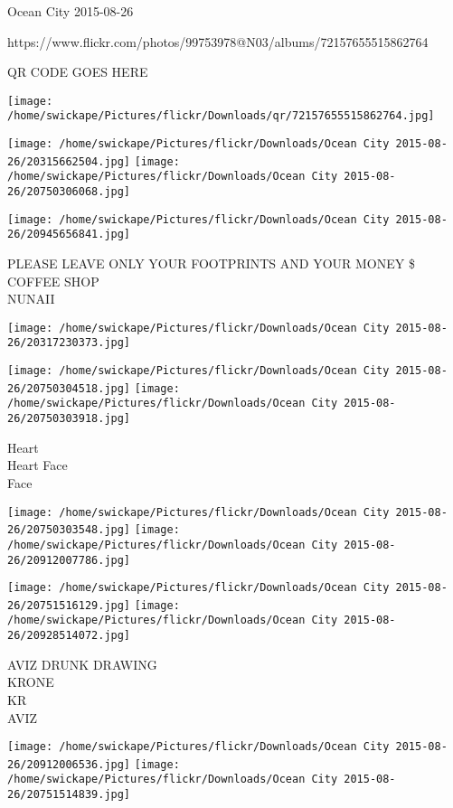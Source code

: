 \documentclass[10pt,letterpaper]{article}
\begin{document}
Ocean City 2015-08-26

https://www.flickr.com/photos/99753978@N03/albums/72157655515862764

QR CODE GOES HERE

\texttt{[image: /home/swickape/Pictures/flickr/Downloads/qr/72157655515862764.jpg]}
\pagebreak

\texttt{[image: /home/swickape/Pictures/flickr/Downloads/Ocean City 2015-08-26/20315662504.jpg]}
\texttt{[image: /home/swickape/Pictures/flickr/Downloads/Ocean City 2015-08-26/20750306068.jpg]}

\texttt{[image: /home/swickape/Pictures/flickr/Downloads/Ocean City 2015-08-26/20945656841.jpg]}

PLEASE LEAVE ONLY YOUR FOOTPRINTS AND YOUR MONEY \$\\
COFFEE SHOP\\
NUNAII\\
\pagebreak

\texttt{[image: /home/swickape/Pictures/flickr/Downloads/Ocean City 2015-08-26/20317230373.jpg]}

\vspace{0.25in}
\texttt{[image: /home/swickape/Pictures/flickr/Downloads/Ocean City 2015-08-26/20750304518.jpg]}
\texttt{[image: /home/swickape/Pictures/flickr/Downloads/Ocean City 2015-08-26/20750303918.jpg]}

Heart\\
Heart Face\\
Face\\
\pagebreak

\texttt{[image: /home/swickape/Pictures/flickr/Downloads/Ocean City 2015-08-26/20750303548.jpg]}
\texttt{[image: /home/swickape/Pictures/flickr/Downloads/Ocean City 2015-08-26/20912007786.jpg]}

\texttt{[image: /home/swickape/Pictures/flickr/Downloads/Ocean City 2015-08-26/20751516129.jpg]}
\texttt{[image: /home/swickape/Pictures/flickr/Downloads/Ocean City 2015-08-26/20928514072.jpg]}

AVIZ DRUNK DRAWING\\
KRONE\\
KR\\
AVIZ\\
\pagebreak

\texttt{[image: /home/swickape/Pictures/flickr/Downloads/Ocean City 2015-08-26/20912006536.jpg]}
\texttt{[image: /home/swickape/Pictures/flickr/Downloads/Ocean City 2015-08-26/20751514839.jpg]}
\end{document}
